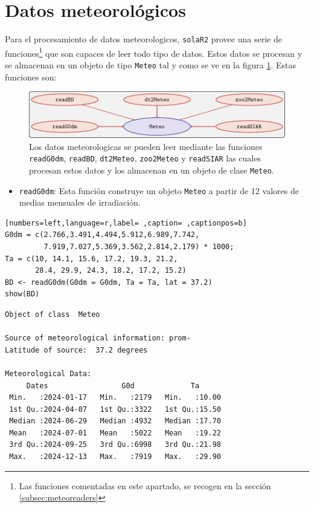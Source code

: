 \section{Datos meteorológicos}
\label{sec:org1dffa13}
\label{sec:datos-meteorologicos}
Para el procesamiento de datos meteorologicos, \texttt{solaR2} provee una serie de funciones\footnote{Las funciones comentadas en este apartado, se recogen en la sección \ref{subsec:meteoreaders}} que son capaces de leer todo tipo de datos. Estos datos se procesan y se almacenan en un objeto de tipo \texttt{Meteo} tal y como se ve en la figura \ref{fig:meteo}. Estas funciones son:
\begin{figure}[]
\centering
\includegraphics[keepaspectratio,width=\textwidth,height=0.5\textheight]{figuras/meteo.pdf}
\caption{Los datos meteorologicas se pueden leer mediante las funciones \texttt{readG0dm}, \texttt{readBD}, \texttt{dt2Meteo}, \texttt{zoo2Meteo} y \texttt{readSIAR} las cuales procesan estos datos y los almacenan en un objeto de clase \texttt{Meteo}. \label{fig:meteo}}
\end{figure}
\begin{itemize}
\item \texttt{readG0dm}: Esta función construye un objeto \texttt{Meteo} a partir de 12 valores de medias mensuales de irradiación.
\end{itemize}
\begin{lstlisting}[numbers=left,language=r,label= ,caption= ,captionpos=b]
G0dm = c(2.766,3.491,4.494,5.912,6.989,7.742,
         7.919,7.027,5.369,3.562,2.814,2.179) * 1000;
Ta = c(10, 14.1, 15.6, 17.2, 19.3, 21.2,
       28.4, 29.9, 24.3, 18.2, 17.2, 15.2)
BD <- readG0dm(G0dm = G0dm, Ta = Ta, lat = 37.2)
show(BD)
\end{lstlisting}

\begin{verbatim}
Object of class  Meteo 

Source of meteorological information: prom- 
Latitude of source:  37.2 degrees

Meteorological Data:
     Dates                 G0d             Ta       
 Min.   :2024-01-17   Min.   :2179   Min.   :10.00  
 1st Qu.:2024-04-07   1st Qu.:3322   1st Qu.:15.50  
 Median :2024-06-29   Median :4932   Median :17.70  
 Mean   :2024-07-01   Mean   :5022   Mean   :19.22  
 3rd Qu.:2024-09-25   3rd Qu.:6998   3rd Qu.:21.98  
 Max.   :2024-12-13   Max.   :7919   Max.   :29.90
\end{verbatim}

